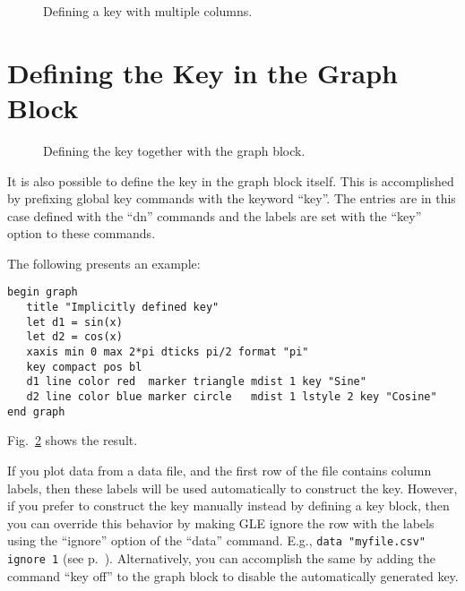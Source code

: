 \begin{figure}[tb]
\centering
\mbox{}
\caption{\label{multicolkey:fig}Defining a key with multiple columns.}
\end{figure}

\section{Defining the Key in the Graph Block}\label{kgrb:sec}

\begin{figure}[tb]
\centering
\mbox{}
\caption{\label{grkey:fig}Defining the key together with the graph block.}
\end{figure}

It is also possible to define the key in the graph block itself. This is accomplished by prefixing global key commands with the keyword ``key''. The entries are in this case defined with the ``dn'' commands and the labels are set with the ``key'' option to these commands.

The following presents an example:

\preglecode{}
\begin{Verbatim}
begin graph
   title "Implicitly defined key"
   let d1 = sin(x)
   let d2 = cos(x)
   xaxis min 0 max 2*pi dticks pi/2 format "pi"
   key compact pos bl
   d1 line color red  marker triangle mdist 1 key "Sine"
   d2 line color blue marker circle   mdist 1 lstyle 2 key "Cosine"
end graph
\end{Verbatim}
\postglecode{}

\noindent{}Fig.~\ref{grkey:fig} shows the result.

If you plot data from a data file, and the first row of the file contains column labels, then these labels will be used automatically to construct the key. However, if you prefer to construct the key manually instead by defining a key block, then you can override this behavior by making GLE ignore the row with the labels using the ``ignore'' option of the ``data'' command. E.g., \verb+data "myfile.csv" ignore 1+ (see p.~\pageref{opt:ignore}). Alternatively, you can accomplish the same by adding the command ``key off'' to the graph block to disable the automatically generated key.




